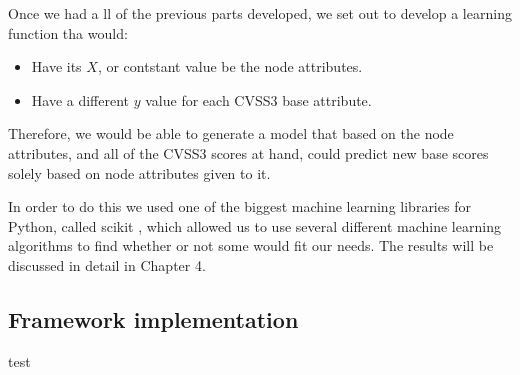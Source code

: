 Once we had a ll of the previous parts developed, we set out to develop a learning function tha would:

\begin{itemize}
	\item Have its $X$, or contstant value be the node attributes.
	\item Have a different $y$ value for each CVSS3 base attribute.
\end{itemize}

Therefore, we would be able to generate a model that based on the node attributes, and all of the CVSS3 scores at hand, could predict new base scores solely based on node attributes given to it.

In order to do this we used one of the biggest machine learning libraries for Python, called scikit \parencite{scikit}, which allowed us to use several different machine learning algorithms to find whether or not some would fit our needs. The results will be discussed in detail in Chapter 4.
\subsection{Framework implementation}
test
